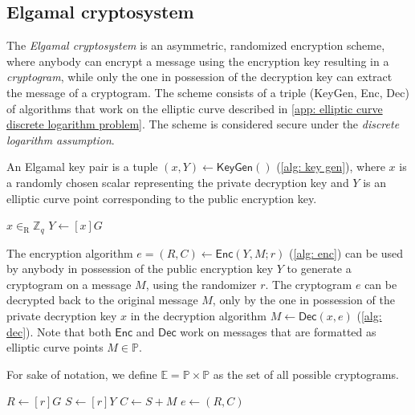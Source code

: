 \subsection{Elgamal cryptosystem} \label{app: elgamal cryptosystem}
The \textit{Elgamal cryptosystem} is an asymmetric, randomized encryption scheme, where anybody can encrypt a message using the encryption key resulting in a \textit{cryptogram}, while only the one in possession of the decryption key can extract the message of a cryptogram. The scheme consists of a triple (\textsf{KeyGen}, \textsf{Enc}, \textsf{Dec}) of algorithms that work on the elliptic curve described in \cref{app: elliptic curve discrete logarithm problem}. The scheme is considered secure under the \textit{discrete logarithm assumption}.

An Elgamal key pair is a tuple $(x, Y) \gets \mathsf{KeyGen}()$ (\cref{alg: key gen}), where $x$ is a randomly chosen scalar representing the private decryption key and $Y$ is an elliptic curve point corresponding to the public encryption key.

\begin{algorithm}[ht]
    \DontPrintSemicolon
    \caption{$\mathsf{KeyGen}()$}
    
    $x \in_\mathrm{R} \mathbb{Z}_q$ \;
    $Y \gets [x]G$ \;
     
    
    \label{alg: key gen}
\end{algorithm}

The encryption algorithm $e = (R, C) \gets \mathsf{Enc} (Y, M; r)$ (\cref{alg: enc}) can be used by anybody in possession of the public encryption key $Y$ to generate a cryptogram on a message $M$, using the randomizer $r$. The cryptogram $e$ can be decrypted back to the original message $M$, only by the one in possession of the private decryption key $x$ in the decryption algorithm $M \gets \mathsf{Dec} (x, e)$ (\cref{alg: dec}). Note that both $\mathsf{Enc}$ and $\mathsf{Dec}$ work on messages that are formatted as elliptic curve points $M \in \mathbb{P}$.

For sake of notation, we define $\mathbb{E} = \mathbb{P} \times \mathbb{P}$ as the set of all possible cryptograms.

\begin{algorithm}[ht]
    \DontPrintSemicolon
    \caption{$\mathsf{Enc} (Y, M; r)$}
    
    $R \gets [r]G$ \;
    $S \gets [r]Y$ \;
    $C \gets S + M$ \;
    $e \gets (R, C)$ \;
     
    
    \label{alg: enc}
\end{algorithm}

